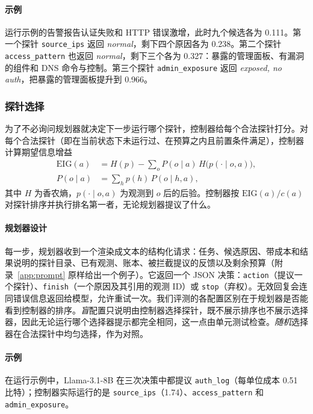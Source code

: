 \paragraph{示例} 运行示例的告警报告认证失败和 HTTP 错误激增，此时九个候选各为 0.111。第一个探针 \texttt{source\_ips} 返回 \textit{normal}，剩下四个原因各为 0.238。第二个探针 \texttt{access\_pattern} 也返回 \textit{normal}，剩下三个各为 0.327：暴露的管理面板、有漏洞的组件和 DNS 命令与控制。第三个探针 \texttt{admin\_exposure} 返回 \textit{exposed, no auth}，把暴露的管理面板提升到 0.966。

\subsubsection{探针选择}
\label{sec:selection}
为了不必询问规划器就决定下一步运行哪个探针，控制器给每个合法探针打分。对每个合法探针（即在当前状态下未运行过、在预算之内且前置条件满足），控制器计算期望信息增益
\begin{align*}
\mathrm{EIG}(a) &= H(p) - \textstyle\sum_{o} P(o \mid a)\, H\big(p(\cdot \mid o, a)\big),\\
P(o \mid a) &= \textstyle\sum_h p(h)\, P(o \mid h, a),
\end{align*}
其中 $H$ 为香农熵，$p(\cdot \mid o, a)$ 为观测到 $o$ 后的后验。控制器按 $\mathrm{EIG}(a)/c(a)$ 对探针排序并执行排名第一者，无论规划器提议了什么。

\paragraph{规划器设计} 每一步，规划器收到一个渲染成文本的结构化请求：任务、候选原因、带成本和结果说明的探针目录、已有观测、账本、被拦截提议的反馈以及剩余预算（附录~\ref{app:prompt} 原样给出一个例子）。它返回一个 JSON 决策：\texttt{action}（提议一个探针）、\texttt{finish}（一个原因及其引用的观测 ID）或 \texttt{stop}（弃权）。无效回复会连同错误信息返回给模型，允许重试一次。我们评测的各配置区别在于规划器是否能看到控制器的排序。\emph{盲}配置只说明由控制器选择探针，既不展示排序也不展示选择器，因此无论运行哪个选择器提示都完全相同，这一点由单元测试检查。\emph{随机}选择器在合法探针中均匀选择，作为对照。

\paragraph{示例} 在运行示例中，Llama-3.1-8B 在三次决策中都提议 \texttt{auth\_log}（每单位成本 0.51 比特）；控制器实际运行的是 \texttt{source\_ips}（1.74）、\texttt{access\_pattern} 和 \texttt{admin\_exposure}。

